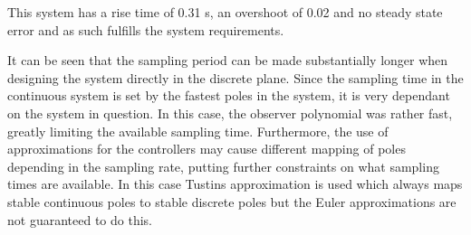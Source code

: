 \documentclass[12pt,a4paper]{article}
\begin{document}
This system has a rise time of 0.31 s, an overshoot of 0.02 and no steady state
error and as such fulfills the system requirements. \par
It can be seen that the sampling period can be made substantially longer when
designing the system directly in the discrete plane. Since the sampling time in
the continuous system is set by the fastest poles in the system, it is very
dependant on the system in question. In this case, the observer polynomial was
rather fast, greatly limiting the available sampling time. Furthermore, the use
of approximations for the controllers may cause different mapping of poles
depending in the sampling rate, putting further constraints on what sampling
times are available. In this case Tustins approximation is used which always
maps stable continuous poles to stable discrete poles but the Euler
approximations are not guaranteed to do this.
\end{document}
